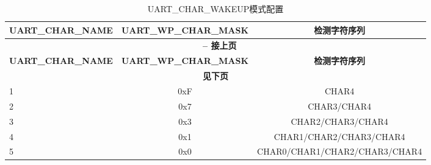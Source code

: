 \begin{longtable}[c]{|l|c|c|}
\caption{UART\_CHAR\_WAKEUP模式配置}
\label{tab:uart-char-wakeup-cfg} \\
    \hline
    \rowcolor{lightgray}
    \textbf{UART\_CHAR\_NAME} & \textbf{UART\_WP\_CHAR\_MASK} & \textbf{检测字符序列} \\\hline
    \endfirsthead
    
    \multicolumn{3}{c}{\bfseries \tablename\ \thetable{} -- 接上页}\\\hline
    \rowcolor{lightgray}
    \textbf{UART\_CHAR\_NAME} & \textbf{UART\_WP\_CHAR\_MASK} & \textbf{检测字符序列} \\\hline
    \endhead
    
    \multicolumn{3}{c}{\textbf{见下页}} \\
    \endfoot    
    \endlastfoot
    
1 & 0xF & CHAR4 \\\hline
2 & 0x7 & CHAR3/CHAR4
 \\\hline
3 & 0x3 & CHAR2/CHAR3/CHAR4
 \\\hline
4 & 0x1 & CHAR1/CHAR2/CHAR3/CHAR4
 \\\hline
5 & 0x0 & CHAR0/CHAR1/CHAR2/CHAR3/CHAR4
 \\\hline
\end{longtable}
